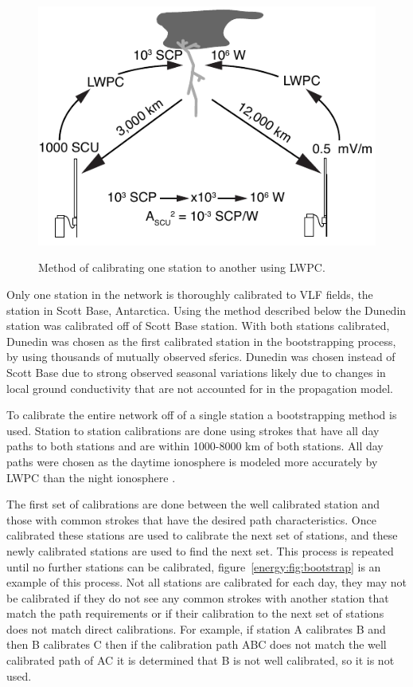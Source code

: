 \begin{figure}[ht!]
\centering
\includegraphics[scale=1]{energy/Figures/PPS_Method.pdf}\\
\caption{Method of calibrating one station to another using LWPC.}
\label{energy:fig:calibrate}
\end{figure}

Only one station in the network is thoroughly calibrated to VLF fields, the station in Scott Base, Antarctica.
Using the method described below the Dunedin station was calibrated off of Scott Base station.
With both stations calibrated, Dunedin was chosen as the first calibrated station in the bootstrapping process, by using thousands of mutually observed sferics.
Dunedin was chosen instead of Scott Base due to strong observed seasonal variations likely due to changes in local ground conductivity that are not accounted for in the propagation model.

To calibrate the entire network off of a single station a bootstrapping method is used.
Station to station calibrations are done using strokes that have all day paths to both stations and are within 1000-8000 km of both stations.
All day paths were chosen as the daytime ionosphere is modeled more accurately by LWPC than the night ionosphere \citep{McRae2000d}.

The first set of calibrations are done between the well calibrated station and those with common strokes that have the desired path characteristics.
Once calibrated these stations are used to calibrate the next set of stations, and these newly calibrated stations are used to find the next set.
This process is repeated until no further stations can be calibrated, figure~\ref{energy:fig:bootstrap} is an example of this process.
Not all stations are calibrated for each day, they may not be calibrated if they do not see any common strokes with another station that match the path requirements or if their calibration to the next set of stations does not match direct calibrations.
For example, if station A calibrates B and then B calibrates C then if the calibration path ABC does not match the well calibrated path of AC it is determined that B is not well calibrated, so it is not used.

